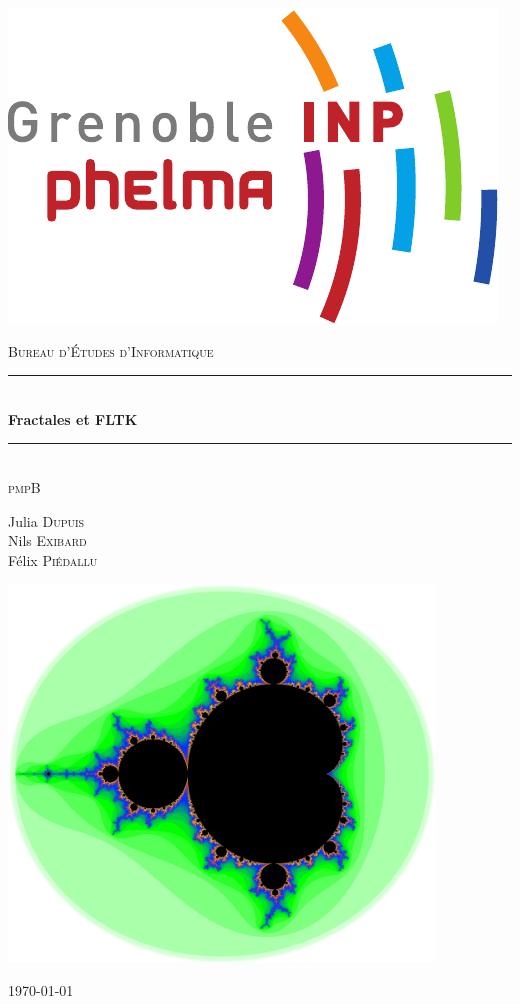 \begin{titlepage}
\includegraphics[scale=0.3]{Images/logo_phelma.pdf}\hfill
\begin{center}
    \textsc{\Large Bureau d'Études d'Informatique}\\
    [1cm] \rule{\linewidth}{0.5mm}\\[0.4cm]
    {\huge\bfseries Fractales et FLTK\\
    [0.4cm]}\rule{\linewidth}{0.5mm}\\[1.0cm]
    \textsc{pmpB}
    \begin{flushright} \large
        Julia \textsc{Dupuis}\\
        Nils \textsc{Exibard}\\
        Félix \textsc{Piédallu}\\
    \end{flushright}
    
    \vfill
  \begin{center}
    \includegraphics[width=0.85\textwidth]{Images/Best.png}
  \end{center}

    \vfill

    \large{\today}
\end{center}
\end{titlepage}
